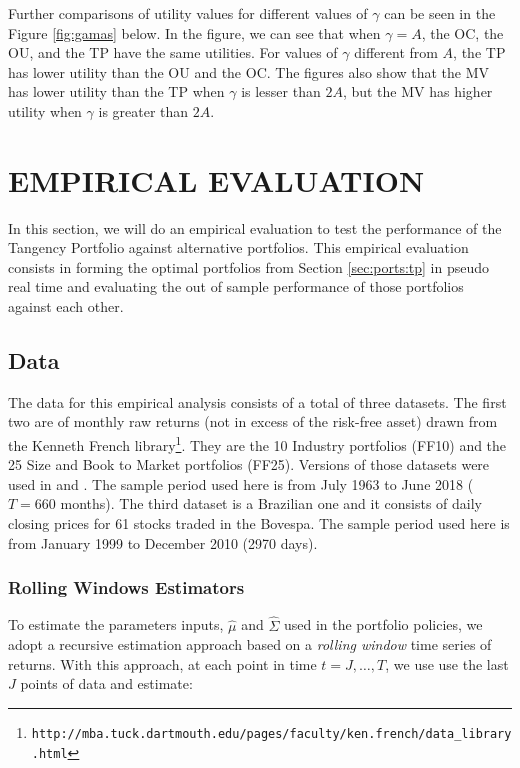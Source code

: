 \documentclass[12pt,oneside,a4paper]{memoir}
\begin{document}
Further comparisons of utility values for different values of $\gamma$ can be seen in the Figure \ref{fig:gamas} below.
In the figure, we can see that when $\gamma=A$, the OC, the OU, and the TP have the same utilities. For values of $\gamma$ different from $A$, the TP has lower utility than the OU and the OC. The figures also show that the MV has lower utility than the TP when $\gamma$ is lesser than $2A$, but the MV has higher utility when $\gamma$ is greater than $2A$.

\section{EMPIRICAL EVALUATION} \label{sec:experiment:tp}
In this section, we will do an empirical evaluation to test the performance of the Tangency Portfolio against alternative portfolios.
This empirical evaluation consists in forming the optimal portfolios from Section \ref{sec:ports:tp} in pseudo real time and evaluating the out of sample performance of those portfolios against each other.

\subsection{Data}
The data for this empirical analysis consists of a total of three datasets.
The first two are of monthly raw returns (not in excess of the risk-free asset) drawn from the Kenneth French library\footnote[1]{\texttt{http://mba.tuck.dartmouth.edu/pages/faculty/ken.french/data\_library.html}}.
They are the 10 Industry portfolios (FF10) and the 25 Size and Book to Market portfolios (FF25).
Versions of those datasets were used in  and .
The sample period used here is from July 1963 to June 2018 ($T=660$ months).
The third dataset is a Brazilian one and it consists of daily closing prices for 61 stocks traded in the Bovespa.
The sample period used here is from January 1999 to December 2010 (2970 days).

\subsubsection*{Rolling Windows Estimators}
To estimate the parameters inputs, $\hat{\mu}$ and $\hat{\Sigma}$ used in the portfolio policies, we adopt a recursive estimation approach based on a \textit{rolling window} time series of returns.
With this approach, at each point in time $t=J, \dots, T$, we use use the last $J$ points of data and estimate:
\end{document}
